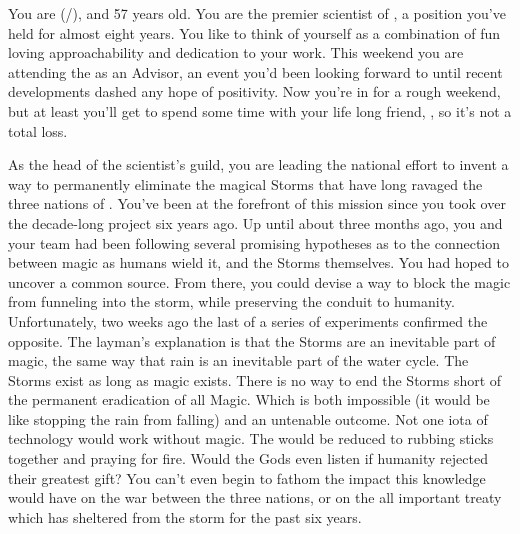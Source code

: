 \documentclass[char]{GL2020}
\begin{document}
\name{\cHeadScientist{}}


You are \cHeadScientist{\full} (\cHeadScientist{\they}/\cHeadScientist{\them}), and 57 years old.  You are the premier scientist of \pTech{}, a position you’ve held for almost eight years. You like to think of yourself as a combination of fun loving approachability and dedication to your work. This weekend you are attending the \pSchool{} as an Advisor, an event you’d been looking forward to until recent developments dashed any hope of positivity. Now you’re in for a rough weekend, but at least you’ll get to spend some time with your life long friend, \cChupInventor{}, so it’s not a total loss.

As the head of the \pTech{} scientist’s guild, you are leading the national effort to invent a way to permanently eliminate the magical Storms that have long ravaged the three nations of \pEarth{}.  You’ve been at the forefront of this mission since you took over the decade-long project six years ago. Up until about three months ago, you and your team had been following several promising hypotheses as to the connection between magic as humans wield it, and the Storms themselves. You had hoped to uncover a common source. From there, you could devise a way to block the magic from funneling into the storm, while preserving the conduit to humanity. Unfortunately, two weeks ago the last of a series of experiments confirmed the opposite. The layman's explanation is that the Storms are an inevitable part of magic, the same way that rain is an inevitable part of the water cycle. The Storms exist as long as magic exists. There is no way to end the Storms short of the permanent eradication of all Magic. Which is both impossible (it would be like stopping the rain from falling) and an untenable outcome. Not one iota of technology would work without magic. The \pTech{} would be reduced to rubbing sticks together and praying for fire. Would the Gods even listen if humanity rejected their greatest gift? You can’t even begin to fathom the impact this knowledge would have on the war between the three nations, or on the all important treaty which has sheltered \pTech{} from the storm for the past six years.  
\end{document}
